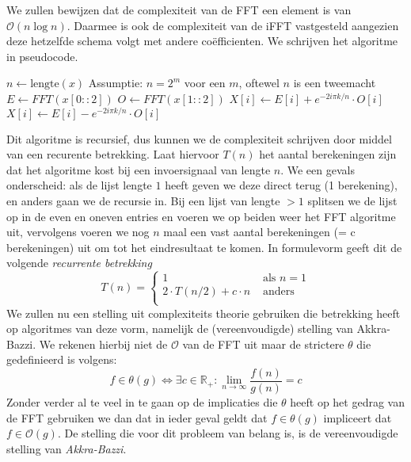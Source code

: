 \documentclass[11pt]{amsart}
\newcommand{\R}{\mathbb{R}}
\renewcommand{\O}{\mathcal{O}}
\begin{document}
We zullen bewijzen dat de complexiteit van de FFT een element is van $\O(n \log n)$. Daarmee is ook de complexiteit van de iFFT vastgesteld aangezien deze hetzelfde schema volgt met andere co\"efficienten. We schrijven het algoritme in pseudocode. \bigskip

\begin{algorithmic}
\State $n \gets \text{lengte}(x)$ \Comment Assumptie: $n = 2^m$ voor een $m$, oftewel $n$ is een tweemacht
\Else
	\State $E \gets FFT(x[0::2])$ 
	\State $O \gets FFT(x[1::2])$ 
			\State $X[i] \gets E[i] + e^{-2i \pi k/n} \cdot O[i]$
		\Else
			\State $X[i] \gets E[i] - e^{-2i \pi k/n} \cdot O[i]$
		\EndIf
	\EndFor
\EndIf
\State {}
\EndFunction
\end{algorithmic} \bigskip

Dit algoritme is recursief, dus kunnen we de complexiteit schrijven door middel van een recurente betrekking. Laat hiervoor $T(n)$ het aantal berekeningen zijn dat het algoritme kost bij een invoersignaal van lengte $n$. We een gevals onderscheid: als de lijst lengte $1$ heeft geven we deze direct terug (1 berekening), en anders gaan we de recursie in. Bij een lijst van lengte $>1$ splitsen we de lijst op in de even en oneven entries en voeren we op beiden weer het FFT algoritme uit, vervolgens voeren we nog $n$ maal een vast aantal berekeningen (= c berekeningen) uit om tot het eindresultaat te komen. In formulevorm geeft dit de volgende \emph{recurrente betrekking}
\[
T(n) = \begin{cases}
    1 &\text{ als } n = 1 \\
      2\cdot T(n/2) + c\cdot n &\text{ anders} \\
\end{cases}
\]
We zullen nu een stelling uit complexiteits theorie gebruiken die betrekking heeft op algoritmes van deze vorm, namelijk de (vereenvoudigde) stelling van Akkra-Bazzi. We rekenen hierbij niet de $\O$ van de FFT uit maar de strictere $\theta$ die gedefinieerd is volgens:
\[
f \in \theta(g) \Leftrightarrow \exists c \in \R_+: \lim_{n \to \infty} \frac{f(n)}{g(n)} = c
\]
Zonder verder al te veel in te gaan op de implicaties die $\theta$ heeft op het gedrag van de FFT gebruiken we dan dat in ieder geval geldt dat $f \in \theta(g)$ impliceert dat $f \in \O(g)$. 
De stelling die voor dit probleem van belang is, is de vereenvoudigde stelling van \emph{Akkra-Bazzi}.
\end{document}
